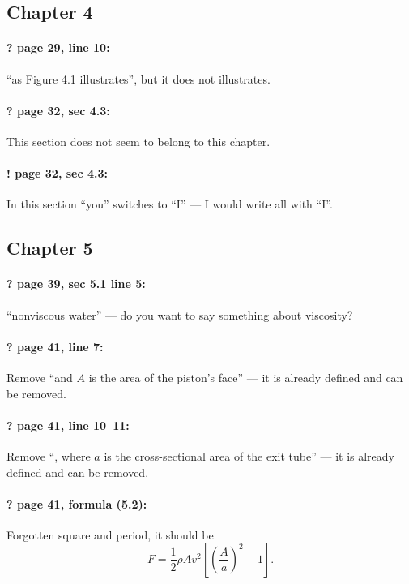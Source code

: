 \documentclass[twoside]{article}
\begin{document}
\subsection*{Chapter 4}

\paragraph{? page 29, line 10:} ``as Figure 4.1 illustrates'', but it does not illustrates.

\paragraph{? page 32, sec 4.3:} This section does not seem to belong to this chapter.

\paragraph{! page 32, sec 4.3:} In this section ``you'' switches to ``I'' --- I would write all with ``I''.

\subsection*{Chapter 5}

\paragraph{? page 39, sec 5.1 line 5:} ``nonviscous water'' --- do you want to say something about viscosity?

\paragraph{? page 41, line 7:} Remove ``and $A$ is the area of the piston’s face'' --- it is already defined and can be removed.

\paragraph{? page 41, line 10--11:} Remove ``, where $a$ is the cross-sectional area of the exit tube'' --- it is already defined and can be removed.

\paragraph{? page 41, formula (5.2):} Forgotten square and period, it should be
\[F = \frac12\rho A v^{2} \left[ \left(\frac{A}{a}\right)^2  - 1 \right].\]
\end{document}
